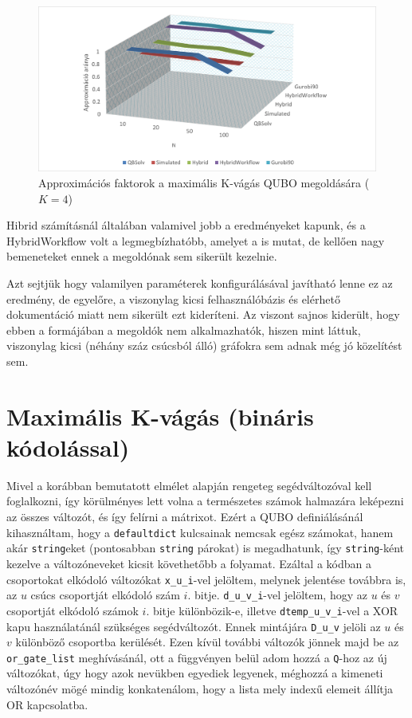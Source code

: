 \begin{figure}[!ht]
	\centering
	\includegraphics[width=150mm, keepaspectratio]{figures/diagrams/maxKCutQUBO_K4approx.png}
	\caption{Approximációs faktorok a maximális K-vágás QUBO megoldására ($K=4$)}
	\label{fig:maxKCutQUBO_K4approx}
\end{figure}

Hibrid számításnál általában valamivel jobb a eredményeket kapunk, és a HybridWorkflow volt a legmegbízhatóbb, amelyet a  is mutat, de kellően nagy bemeneteket ennek a megoldónak sem sikerült kezelnie.

Azt sejtjük hogy valamilyen paraméterek konfigurálásával javítható lenne ez az eredmény, de egyelőre, a viszonylag kicsi felhasználóbázis és elérhető dokumentáció miatt nem sikerült ezt kideríteni. Az viszont sajnos kiderült, hogy ebben a formájában a megoldók nem alkalmazhatók, hiszen mint láttuk, viszonylag kicsi (néhány száz csúcsból álló) gráfokra sem adnak még jó közelítést sem.

\section{Maximális K-vágás (bináris kódolással)}\label{sec:practiceBinary}

Mivel a korábban bemutatott elmélet alapján rengeteg segédváltozóval kell foglalkozni, így körülményes lett volna a természetes számok halmazára leképezni az összes változót, és így felírni a mátrixot. Ezért a QUBO definiálásánál kihasználtam, hogy a \verb+defaultdict+ kulcsainak nemcsak egész számokat, hanem akár \verb+string+eket (pontosabban \verb+string+ párokat) is megadhatunk, így \verb+string+-ként kezelve a változóneveket kicsit követhetőbb a folyamat. Ezáltal a kódban a csoportokat elkódoló változókat \verb+x_u_i+-vel jelöltem, melynek jelentése továbbra is, az $u$ csúcs csoportját elkódoló szám $i.$ bitje. \verb+d_u_v_i+-vel jelöltem, hogy az $u$ és $v$ csoportját elkódoló számok $i.$ bitje különbözik-e, illetve \verb+dtemp_u_v_i+-vel a XOR kapu használatánál szükséges segédváltozót. Ennek mintájára \verb+D_u_v+ jelöli az $u$ és $v$ különböző csoportba kerülését. Ezen kívül további változók jönnek majd be az \verb+or_gate_list+ meghívásánál, ott a függvényen belül adom hozzá a \verb+Q+-hoz az új változókat, úgy hogy azok nevükben egyediek legyenek, méghozzá a kimeneti változónév mögé mindig konkatenálom, hogy a lista mely indexű elemeit állítja OR kapcsolatba.

